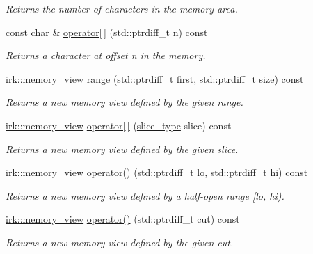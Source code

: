 \begin{DoxyCompactItemize}
\begin{DoxyCompactList}\small\item\em Returns the number of characters in the memory area. \end{DoxyCompactList}\item 
const char \& \mbox{\hyperlink{classirk_1_1memory__view_a21ac618a1eaddf6665148d186f3f67a4}{operator\mbox{[}$\,$\mbox{]}}} (std\+::ptrdiff\+\_\+t n) const
\begin{DoxyCompactList}\small\item\em Returns a character at offset {\ttfamily n} in the memory. \end{DoxyCompactList}\item 
\mbox{\hyperlink{classirk_1_1memory__view}{irk\+::memory\+\_\+view}} \mbox{\hyperlink{classirk_1_1memory__view_a5edb4d5f580fdcc20f131e8980d1f7aa}{range}} (std\+::ptrdiff\+\_\+t first, std\+::ptrdiff\+\_\+t \mbox{\hyperlink{classirk_1_1memory__view_af9ae4528f4f33cf24ab65115f96b7e18}{size}}) const
\begin{DoxyCompactList}\small\item\em Returns a new memory view defined by the given range. \end{DoxyCompactList}\item 
\mbox{\hyperlink{classirk_1_1memory__view}{irk\+::memory\+\_\+view}} \mbox{\hyperlink{classirk_1_1memory__view_ae16ba32b9419a8918762132186a00463}{operator\mbox{[}$\,$\mbox{]}}} (\mbox{\hyperlink{classirk_1_1memory__view_ac0c1d9600bf81e8cb861a89ab104a43c}{slice\+\_\+type}} slice) const
\begin{DoxyCompactList}\small\item\em Returns a new memory view defined by the given slice. \end{DoxyCompactList}\item 
\mbox{\hyperlink{classirk_1_1memory__view}{irk\+::memory\+\_\+view}} \mbox{\hyperlink{classirk_1_1memory__view_a3512cd124a9e37db75e295e1ff9fcf96}{operator()}} (std\+::ptrdiff\+\_\+t lo, std\+::ptrdiff\+\_\+t hi) const
\begin{DoxyCompactList}\small\item\em Returns a new memory view defined by a half-\/open range \mbox{[}lo, hi). \end{DoxyCompactList}\item 
\mbox{\hyperlink{classirk_1_1memory__view}{irk\+::memory\+\_\+view}} \mbox{\hyperlink{classirk_1_1memory__view_a08de0b791c9f50ad1b646e85fb67e734}{operator()}} (std\+::ptrdiff\+\_\+t cut) const
\begin{DoxyCompactList}\small\item\em Returns a new memory view defined by the given cut. \end{DoxyCompactList}\item 

\end{DoxyCompactItemize}
